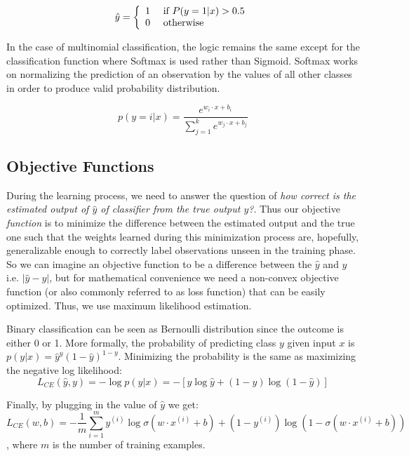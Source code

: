 $$  \hat { y } = \left\{ \begin{array} { l l } { 1 } & { \text { if } P ( y = 1 | x ) > 0.5 } \\ { 0 } & { \text { otherwise } } \end{array} \right.  $$


In the case of multinomial classification, the logic remains the same except for the classification function where Softmax is used rather than Sigmoid. Softmax works on normalizing the prediction of an observation by the values of all other classes in order to produce valid probability distribution. 

$$p ( y = i | x ) = \frac { e ^ { w _ { i } \cdot x + b _ { i } } } { \sum _ { j = 1 } ^ { k } e ^ { w _ { j } \cdot x + b _ { j } } }$$



\subsection{Objective Functions}

During the learning process, we need to answer the question of \emph{how correct is the estimated output of $\hat{y}$ of classifier from the true output $y$?}. Thus our objective \emph{function} is to minimize the difference between the estimated output and the true one such that the weights learned during this minimization process are, hopefully,  generalizable enough to correctly label observations unseen in the training phase. So we can imagine an objective function to be a difference between the $\hat{y}$ and $y$ i.e. $\left | \hat{y} - y \right |$, but for mathematical convenience we need a non-convex objective function (or also commonly referred to as loss function)  that can be easily optimized. Thus, we use maximum likelihood estimation. 

Binary classification can be seen as Bernoulli distribution since the outcome is either 0 or 1. More formally, the probability of predicting class $y$ given input $x$ is  $p ( y | x ) = \hat { y } ^ { y } ( 1 - \hat { y } ) ^ { 1 - y }$. Minimizing the probability is the same as maximizing the negative log likelihood:
 $$L _ { C E } ( \hat { y } , y ) = - \log p ( y | x ) = - [ y \log \hat { y } + ( 1 - y ) \log ( 1 - \hat { y } ) ]$$

Finally, by plugging in the value of $\hat{y}$ we get:
$$ L _ { C E } ( w , b ) = - \frac { 1 } { m } \sum _ { i = 1 } ^ { m } y ^ { ( i ) } \log \sigma \left( w \cdot x ^ { ( i ) } + b \right) + \left( 1 - y ^ { ( i ) } \right) \log \left( 1 - \sigma \left( w \cdot x ^ { ( i ) } + b \right) \right) $$, where $m$ is the number of training examples.

